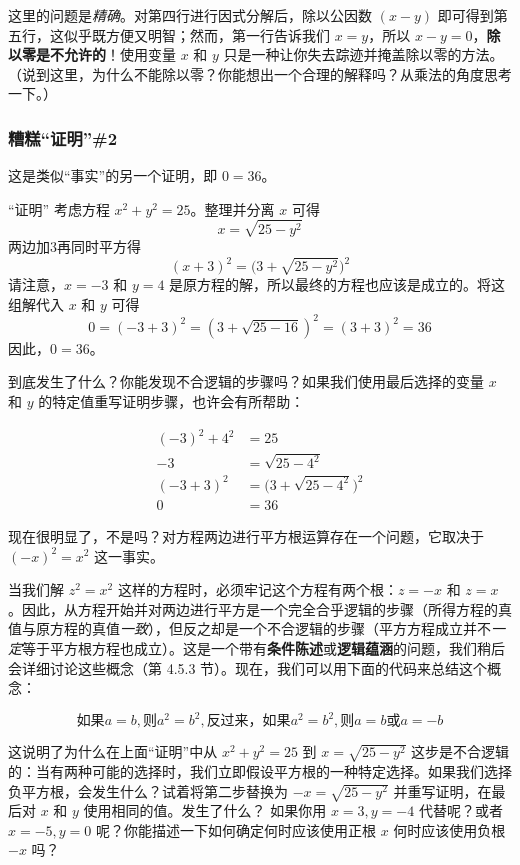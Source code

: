 这里的问题是\emph{精确}。对第四行进行因式分解后，除以公因数 $(x - y)$ 即可得到第五行，这似乎既方便又明智；然而，第一行告诉我们 $x = y$，所以 $x-y = 0$，\textbf{除以零是不允许的}！使用变量 $x$ 和 $y$ 只是一种让你失去踪迹并掩盖除以零的方法。（说到这里，为什么不能除以零？你能想出一个合理的解释吗？从乘法的角度思考一下。）

\subsubsection*{糟糕``证明''\#2}

这是类似``事实''的另一个证明，即 $0 = 36$。

\begin{proofs}{``证明''}
    考虑方程 $x^2+y^2 = 25$。整理并分离 $x$ 可得
    \[x = \sqrt{25-y^2}\]
    两边加3再同时平方得
    \[(x+3)^2=\Big(3+\sqrt{25-y^2}\Big)^2\]
    请注意，$x = -3$ 和 $y = 4$ 是原方程的解，所以最终的方程也应该是成立的。将这组解代入 $x$ 和 $y$ 可得
    \[0 = (-3+3)^2 = (3+\sqrt{25-16})^2 = (3+3)^2 = 36\]
    因此，$0 = 36$。
\end{proofs}

到底发生了什么？你能发现不合逻辑的步骤吗？如果我们使用最后选择的变量 $x$ 和 $y$ 的特定值重写证明步骤，也许会有所帮助：

\begin{align*}
    (-3)^2+4^2 &= 25 \\
    -3 &= \sqrt{25-4^2} \\
    (-3+3)^2 &= \Big(3+\sqrt{25-4^2}\Big)^2 \\
    0 &= 36
\end{align*}

现在很明显了，不是吗？对方程两边进行平方根运算存在一个问题，它取决于 $(-x)^2=x^2$ 这一事实。

当我们解 $z^2=x^2$ 这样的方程时，必须牢记这个方程有两个根：$z = -x$ 和 $z = x$。因此，从方程开始并对两边进行平方是一个完全合乎逻辑的步骤（所得方程的真值与原方程的真值\emph{一致}），但反之却是一个不合逻辑的步骤（平方方程成立并不\emph{一定}等于平方根方程也成立）。这是一个带有\textbf{条件陈述}或\textbf{逻辑蕴涵}的问题，我们稍后会详细讨论这些概念（第 4.5.3 节）。现在，我们可以用下面的代码来总结这个概念：

\[\text{如果} a=b, \text{则} a^2=b^2, \text{反过来，如果} a^2=b^2, \text{则} a=b \text{或} a=-b\]

这说明了为什么在上面``证明''中从 $x^2+y^2 = 25$ 到 $x = \sqrt{25-y^2}$ 这步是不合逻辑的：当有两种可能的选择时，我们立即假设平方根的一种特定选择。如果我们选择负平方根，会发生什么？试着将第二步替换为 $-x = \sqrt{25-y^2}$ 并重写证明，在最后对 $x$ 和 $y$ 使用相同的值。发生了什么？ 如果你用 $x = 3, y = -4$ 代替呢？或者 $x=-5, y=0$ 呢？你能描述一下如何确定何时应该使用正根 $x$ 何时应该使用负根 $-x$ 吗？

